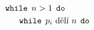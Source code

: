 \documentclass[preview]{standalone}
\begin{document}
\begin{align*}
\mathtt{while} & \:\: n > 1 \:\:  \mathtt{do}  \\&\hspace*{-1em} \mathtt{while}  \:\: p_i \text{ dělí } n \:\:  \mathtt{do}
\end{align*}
\end{document}
